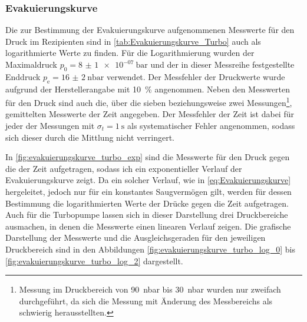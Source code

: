 \subsubsection{Evakuierungskurve}
Die zur Bestimmung der Evakuierungskurve aufgenommenen Messwerte für den Druck
im Rezipienten sind in \cref{tab:Evakuierungskurve_Turbo} auch als logarithmierte
Werte zu finden. Für die Logarithmierung wurden der Maximaldruck $p_{0} =\SI{8(1)e-07}{\bar} $
und der in dieser Messreihe festgestellte Enddruck $p_{\mathrm{e}} =\SI{16(2)}{\nano\bar}$ verwendet.
Der Messfehler der Druckwerte wurde aufgrund der Herstellerangabe \cite{Hefter} mit \SI{10}{\percent} angenommen.
Neben den Messwerten für den Druck sind auch die, über die sieben beziehungsweise zwei Messungen\footnote{
Messung im Druckbereich von \SI{90}{\nano\bar} bis \SI{30}{\nano\bar} wurden nur zweifach durchgeführt,
da sich die Messung mit Änderung des Messbereichs als schwierig herausstellten.}, 
gemittelten Messwerte der Zeit angegeben. Der Messfehler der Zeit ist dabei für jeder der Messungen mit
$\sigma_{t} = \SI{1}{\s}$ als systematischer Fehler angenommen, sodass sich dieser durch die Mittlung nicht verringert.


In \cref{fig:evakuierungskurve_turbo_exp} sind die Messwerte für den Druck gegen die der Zeit aufgetragen,
sodass ich ein exponentieller Verlauf der Evakuierungskurve zeigt. Da ein solcher Verlauf, wie in 
\eqref{eq:Evakuierungskurve} hergeleitet, jedoch nur für ein konstantes Saugvermögen gilt, werden für dessen Bestimmung die logarithmierten Werte der Drücke gegen die Zeit aufgetragen.
Auch für die Turbopumpe lassen sich in dieser Darstellung drei Druckbereiche ausmachen,
in denen die Messwerte einen linearen Verlauf zeigen. Die grafische Darstellung der Messwerte und die 
Ausgleichsgeraden für den jeweiligen Druckbereich sind in den Abbildungen \ref{fig:evakuierungskurve_turbo_log_0} 
bis \ref{fig:evakuierungskurve_turbo_log_2} dargestellt.\\

{%

\FloatBarrier}

{%

\FloatBarrier

\FloatBarrier

\FloatBarrier}

